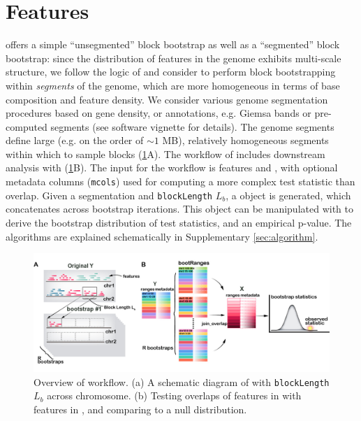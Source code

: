 \vspace*{-20pt}

\section{Features}

\bootranges offers a simple ``unsegmented'' block bootstrap as well as
a ``segmented'' block bootstrap:
since the distribution of features in the genome exhibits multi-scale
structure, we follow the logic of \citet{bickel2010subsampling} and consider to
perform block bootstrapping within \textit{segments} of the genome, which are
more homogeneous in terms of base composition and feature density.
We consider various genome segmentation procedures based on gene
density, or annotations, e.g. Giemsa bands or pre-computed segments
(see software vignette for details).
The genome segments define large (e.g. on the order of ${\sim}1$ MB),
relatively homogeneous segments within which to sample blocks
(\cref{fig:framework}A). 
The workflow of \bootranges includes downstream analysis with
\plyranges (\cref{fig:framework}B).
The input for the workflow is \granges features  and
, with optional metadata columns (\texttt{mcols}) used for
computing a more complex test statistic than overlap.
Given a segmentation and \texttt{blockLength} $L_b$, a \bootranges
object is generated, which concatenates \granges across bootstrap
iterations. This \bootranges object can be manipulated with \plyranges
to derive the bootstrap distribution of test statistics, and an
empirical p-value.
The \bootranges algorithms are explained schematically in Supplementary \cref{sec:algorithm}.

\vspace{-0.3cm}
\begin{figure}[htbp]
\centering%
\setlength{\abovecaptionskip}{-0.05cm}
\includegraphics[scale=0.65]{Figures/bootRanges.jpg}
\caption{Overview of \bootranges workflow. (a) A schematic
  diagram of \bootranges with \texttt{blockLength} $L_b$ across chromosome.
  (b) Testing overlaps of features in  with features in
  , and comparing to a null distribution.} 
\label{fig:framework}
\vspace{-0.5cm}
\end{figure}

